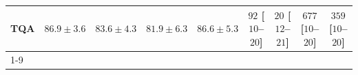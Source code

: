 \begin{tabular}{l|cccc|cccc|}
TQA & {\cellcolor[HTML]{1278B4}} \color[HTML]{F1F1F1} $86.9\pm 3.6$ & {\cellcolor[HTML]{4094C3}} \color[HTML]{F1F1F1} $83.6\pm 4.3$ & {\cellcolor[HTML]{5EA0CA}} \color[HTML]{F1F1F1} $81.9\pm 6.3$ & {\cellcolor[HTML]{167BB6}} \color[HTML]{F1F1F1} $86.6\pm 5.3$ & {\cellcolor[HTML]{FDE2DF}} \color[HTML]{000000} $92$ [$10$--$20$] & {\cellcolor[HTML]{FFF3F0}} \color[HTML]{000000} $20$ [$12$--$21$] & {\cellcolor[HTML]{7F0178}} \color[HTML]{F1F1F1} $677$ [$10$--$20$] & {\cellcolor[HTML]{F87CA8}} \color[HTML]{F1F1F1} $359$ [$10$--$20$] \\
\cline{1-9}
\bottomrule
\end{tabular}
